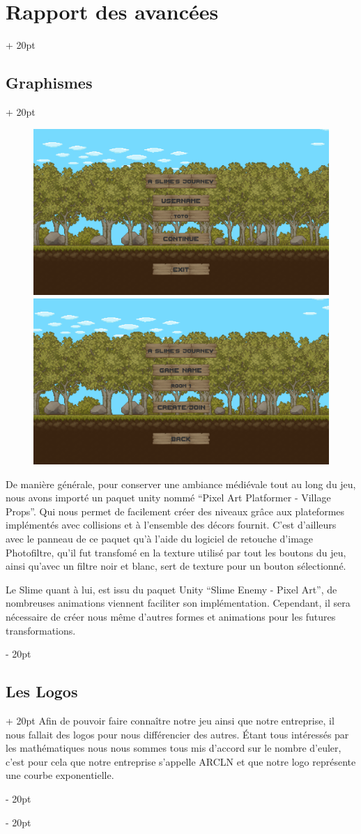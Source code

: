 \documentclass[a4paper, 12pt, twoside]{article}
\newcommand{\ind}[1][20pt]{\advance\leftskip + #1}
\newcommand{\deind}[1][20pt]{\advance\leftskip - #1}
\newenvironment{indt}[2][20pt]{#2 \par \ind[#1]}{\par \deind} %
\begin{document}
\begin{indt}{\section{Rapport des avancées}}
\begin{indt}{\subsection{Graphismes}}
            \begin{figure}
                \includegraphics[width=0.49\linewidth]{MMV22.png}\hfill \hfill\includegraphics[width=0.49\linewidth]{MMV23.png}
            \end{figure}

            De manière générale, pour conserver une ambiance médiévale tout au long du jeu, nous avons importé un paquet unity nommé “Pixel Art Platformer - Village Props”. Qui nous permet de facilement créer des niveaux grâce aux plateformes implémentés avec collisions et à l'ensemble des décors fournit. C'est d'ailleurs avec le panneau de ce paquet qu'à l'aide du logiciel de retouche d'image Photofiltre, qu'il fut transfomé en la texture utilisé par tout les boutons du jeu, ainsi qu'avec un filtre noir et blanc, sert de texture pour un bouton sélectionné. 

            Le Slime quant à lui, est issu du paquet Unity “Slime Enemy - Pixel Art”, de nombreuses animations viennent faciliter son implémentation. Cependant, il sera nécessaire de créer nous même d'autres formes et animations pour les futures transformations.
        \end{indt}

        \begin{indt}{\subsection{Les Logos}}
            Afin de pouvoir faire connaître notre jeu ainsi que notre entreprise, il nous fallait des logos pour nous différencier des autres. Étant tous intéressés par les mathématiques nous nous sommes tous mis d'accord sur le nombre d'euler, c'est pour cela que notre entreprise s'appelle ARCLN et que notre logo représente une courbe exponentielle.
        

\end{indt}
\end{indt}
\end{document}
